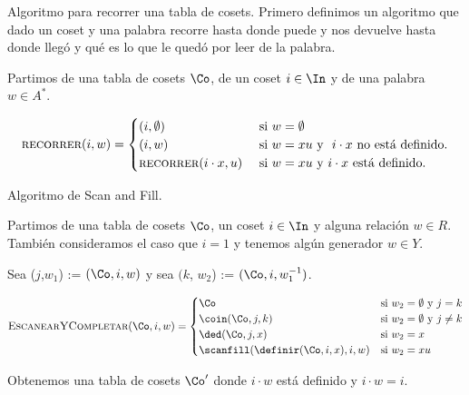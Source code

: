 \documentclass[aspectratio=169, 9pt]{beamer}
\begin{document}
\begin{frame}[fragile]{Algoritmo para recorrer una tabla de cosets.}
	Primero definimos un algoritmo que dado un coset y una palabra recorre hasta donde puede y nos devuelve hasta donde llegó y qué es lo que le quedó por leer de la palabra.
	
	\pause
	Partimos de una tabla de cosets $\Co$, de un coset $i \in \In$ y de una palabra $w \in A^*$.
		
	\begin{equation*}
		\textsc{recorrer}(i,w) = 
		\begin{cases}
			(i, \emptyset) \ \ &\text{si} \ w = \emptyset \\
			(i, w) \  &\text{si} \ w = xu \  \text{y} \ \ i \cdot x \ \text{no está definido.} \\
			\textsc{recorrer}(i \cdot x, u) \ &\text{si} \ w = xu \ \text{y} \  i \cdot x  \text{ está definido.} \\
		\end{cases}
	\end{equation*}

	
	
	
	
	
\end{frame}

\begin{frame}[fragile]{Algoritmo de Scan and Fill.}
	
		Partimos de una tabla de cosets $\Co$, un coset $i \in \In$ y alguna relación $w \in R$. 
		También consideramos el caso que  $i = 1$ y tenemos algún generador $w \in Y$.
		\pause
		
		{Sea} ($j$,$w_1$) := \recorrer$(\Co, i, w)$ y sea $({k}$, $w_2$) :=  \recorrer$(\Co,i, w_1^{-1})$.
		
		\pause
		\begin{equation*}
			\textsc{EscanearYCompletar}(\Co, i , w) = 
			\begin{cases}
				\Co \ &\text{si} \  w_2 = \emptyset \ \text{y} \ j=k  \\
				\coin({\Co, j,k}) & \text{si} \  w_2 = \emptyset \ \text{y} \ j \neq k   \\
				\ded(\Co, j, x) & \text{si} \ w_2 = x   \\
				\scanfill(\definir(\Co,i,x),i,w) & \text{si} \ w_2 = xu
			\end{cases}
		\end{equation*}
		
		\pause
		Obtenemos una tabla de cosets $\Co'$ donde $i \cdot w$ está definido y $i \cdot w = i$.
\end{frame}
\end{document}
